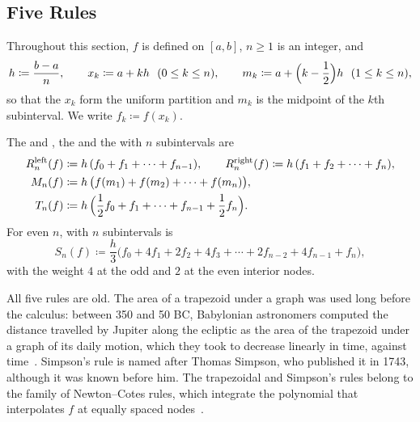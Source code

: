 \subsection{Five Rules}

Throughout this section, $f$ is defined on $[a,b]$, $n\ge1$ is an integer, and
\[
h\coloneqq\frac{b-a}n,\qquad x_k\coloneqq a+kh\ \ (0\le k\le n),\qquad m_k\coloneqq a+\Bigl(k-\frac12\Bigr)h\ \ (1\le k\le n),
\]
so that the $x_k$ form the uniform partition and $m_k$ is the midpoint of the $k$th subinterval. We write $f_k\coloneqq f(x_k)$.

\begin{definition}
\label{def:quadrature-rules}
The  and , the  and the  with $n$ subintervals are
\begin{align*}
R^{\mathrm{left}}_n(f)&\coloneqq h\,(f_0+f_1+\cdots+f_{n-1}),\qquad R^{\mathrm{right}}_n(f)\coloneqq h\,(f_1+f_2+\cdots+f_n),\\
M_n(f)&\coloneqq h\,\bigl(f(m_1)+f(m_2)+\cdots+f(m_n)\bigr),\\
T_n(f)&\coloneqq h\,\Bigl(\frac12f_0+f_1+\cdots+f_{n-1}+\frac12f_n\Bigr).
\end{align*}
For even $n$,  with $n$ subintervals is
\[
S_n(f)\coloneqq\frac h3\bigl(f_0+4f_1+2f_2+4f_3+\cdots+2f_{n-2}+4f_{n-1}+f_n\bigr),
\]
with the weight $4$ at the odd and $2$ at the even interior nodes.
\end{definition}

All five rules are old. The area of a trapezoid under a graph was used long before the calculus: between 350 and 50 BC, Babylonian astronomers computed the distance travelled by Jupiter along the ecliptic as the area of the trapezoid under a graph of its daily motion, which they took to decrease linearly in time, against time~\cite{ossendrijver2016}. Simpson's rule is named after Thomas Simpson, who published it in 1743, although it was known before him. The trapezoidal and Simpson's rules belong to the family of Newton--Cotes rules, which integrate the polynomial that interpolates $f$ at equally spaced nodes~\cite{goldstine1977,davis1984}.

